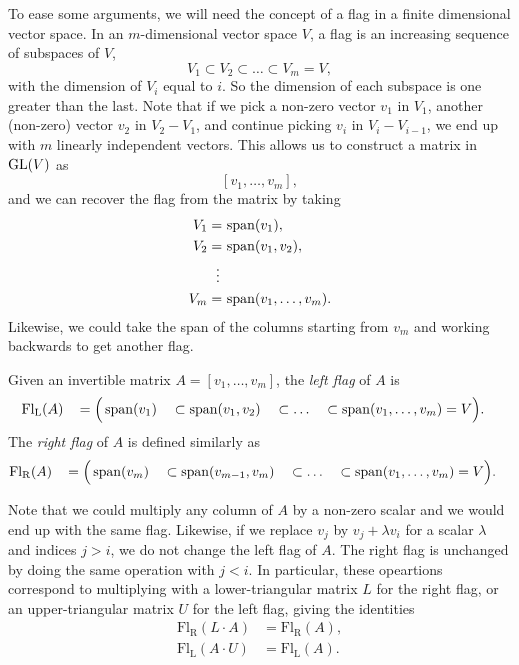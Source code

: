 To ease some arguments, we will need the concept of a flag in a finite
dimensional vector space. In an
$m$-dimensional vector space $V$, a flag is an increasing sequence of
subspaces of $V$,
\[ V_1 \subset V_2 \subset \dots \subset V_m = V, \]
with the dimension of $V_i$ equal to $i$. So the dimension of each
subspace is one greater than the last. Note that if we pick a non-zero
vector $v_1$ in $V_1$, another (non-zero) vector $v_2$ in $V_2 - V_1$,
and continue picking $v_i$ in $V_i - V_{i-1}$, we end up with $m$
linearly independent vectors. This allows us to construct a matrix in
$\operatorname{GL}(V)$ as
\[ [v_1,\dots,v_m], \]
and we can recover the flag from the matrix by taking
\begin{align*}
  V_1 =\, &\operatorname{span}(v_1), \\
  V_2 =\, &\operatorname{span}(v_1,v_2), \\
  \vdots\,\, & \\
  V_m =\, &\operatorname{span}(v_1,\dots,v_m).
\end{align*}
Likewise, we could take the span of the columns starting from $v_m$
and working backwards to get another flag.
\begin{definition}
  Given an invertible matrix $A = [v_1,\dots,v_m]$, the \textit{left
    flag} of $A$ is
  \begin{alignat*}{5}
    \mathrm{Fl_L}(A)\, &&= \Big(&\operatorname{span}(v_1) &&\subset \operatorname{span}(v_1,v_2)
    &&\subset \dots &&\subset \operatorname{span}(v_1,\dots,v_m) = V\Big).
  \end{alignat*}
  The \textit{right flag} of $A$ is defined similarly as
  \begin{alignat*}{5}
    \mathrm{Fl_R}(A)\, &&= \Big(&\operatorname{span}(v_m) &&\subset
    \operatorname{span}(v_{m-1},v_m) &&\subset \dots &&\subset
    \operatorname{span}(v_1,\dots,v_m) = V\Big). 
  \end{alignat*}
\end{definition}
Note that we could multiply any column of $A$ by a non-zero scalar and
we would end up with the same flag. Likewise, if we replace $v_j$ by
$v_j + \lambda v_i$ for a scalar $\lambda$ and indices $j > i$, we do not
change the left flag of $A$. The right flag is unchanged by doing
the same operation with $j < i$. In particular, these opeartions
correspond to multiplying with a lower-triangular matrix $L$ for the
right flag, or an upper-triangular matrix $U$ for the left flag,
giving the identities
\begin{align*}
  \mathrm{Fl_R}(L\cdot A) &= \mathrm{Fl_R}(A), \\
  \mathrm{Fl_L}(A \cdot U) &= \mathrm{Fl_L}(A).
\end{align*}
